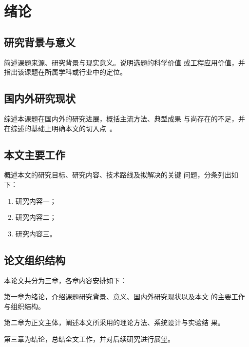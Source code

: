 \chapter{绪论}
\label{chap:intro}

\section{研究背景与意义}
简述课题来源、研究背景与现实意义。说明选题的科学价值
或工程应用价值，并指出该课题在所属学科或行业中的定位。

\section{国内外研究现状}
综述本课题在国内外的研究进展，概括主流方法、典型成果
与尚存在的不足，并在综述的基础上明确本文的切入点~\cite{example1}。

\section{本文主要工作}
概述本文的研究目标、研究内容、技术路线及拟解决的关键
问题，分条列出如下：
\begin{enumerate}
\item 研究内容一；
\item 研究内容二；
\item 研究内容三。
\end{enumerate}

\section{论文组织结构}
本论文共分为三章，各章内容安排如下：

第一章为绪论，介绍课题研究背景、意义、国内外研究现状以及本文
的主要工作与组织结构。

第二章为正文主体，阐述本文所采用的理论方法、系统设计与实验结
果。

第三章为结论，总结全文工作，并对后续研究进行展望。
